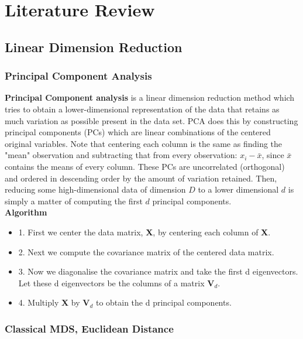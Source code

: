 \documentclass[12pt]{report}
\begin{document}
\chapter{Literature Review}

\section{Linear Dimension Reduction}

\subsection{Principal Component Analysis}

\textbf{Principal Component analysis} is a linear dimension reduction method 
which tries to obtain a lower-dimensional representation of the data 
that retains as much variation as possible present in the data set. 
PCA does this by constructing principal components (PCs) 
which are linear combinations of the centered original variables. 
Note that centering each column is the same as finding the "mean" 
observation and subtracting that from every observation: $x_i - \bar{x}$, 
since $\bar{x}$ contains the means of every column.
These PCs are uncorrelated (orthogonal) and ordered in descending order 
by the amount of variation retained. 
Then, reducing some high-dimensional data of dimension $D$ to a lower dimensional $d$ 
is simply a matter of computing the first $d$ principal components.\\
\textbf{Algorithm}
\begin{itemize}
    \item 1. First we center the data matrix, \textbf{X}, by centering each column of \textbf{X}.
    \item 2. Next we compute the covariance matrix of the centered data matrix.
    \item 3. Now we diagonalise the covariance matrix and take the first d eigenvectors. 
    Let these d eigenvectors be the columns of a matrix $\textbf{V}_d$.
    \item 4. Multiply \textbf{X} by $\textbf{V}_d$ to obtain the d principal components.
\end{itemize}

\subsection{Classical MDS, Euclidean Distance}
\end{document}
